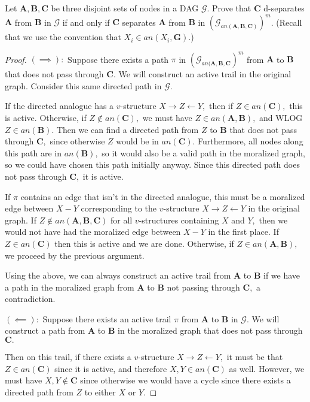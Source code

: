\documentclass[letterpaper]{article}
\begin{document}
Let $\mathbf{A,B,C}$ be three disjoint sets of nodes in a DAG $\mathcal{G}$. Prove that $\mathbf{C}$ d-separates $\mathbf{A}$ from $\mathbf{B}$ in $\mathcal{G}$ if and only if $\mathbf{C}$ separates $\mathbf{A}$ from $\mathbf{B}$ in $(\mathcal{G}_{an(\mathbf{A,B,C})})^m$. (Recall that we use the convention that $X_i \in an(X_i,\mathbf{G})$.)
\begin{proof}
  $(\implies):$ Suppose there exists a path $\pi$ in $\left( \mathcal{G}_{an(\mathbf{A, B, C}} \right)^m$ from $\mathbf{A}$ to $\mathbf{B}$ that does not pass through $\mathbf{C}.$ We will construct an active trail in the original graph. Consider this same directed path in $\mathcal{G}.$ 
    
    If the directed analogue has a $v$-structure $X\to Z\gets Y,$ then if $Z\in an(\mathbf{C}),$ this is active. Otherwise, if $Z\not\in an(\mathbf{C}),$ we must have $Z\in an(\mathbf{A, B}),$ and WLOG $Z\in an(\mathbf{B}).$ Then we can find a directed path from $Z$ to $\mathbf{B}$ that does not pass through $\mathbf{C},$ since otherwise $Z$ would be in $an(\mathbf{C}).$ Furthermore, all nodes along this path are in $an(\mathbf{B}),$ so it would also be a valid path in the moralized graph, so we could have chosen this path initially anyway. Since this directed path does not pass through $\mathbf{C},$ it is active.

    If $\pi$ contains an edge that isn't in the directed analogue, this must be a moralized edge between $X-Y$ corresponding to the $v$-structure $X\to Z\gets Y$ in the original graph. If $Z\not\in an(\mathbf{A, B, C})$ for all $v$-structures containing $X$ and $Y,$ then we would not have had the moralized edge between $X-Y$ in the first place. If $Z\in an(\mathbf{C})$ then this is active and we are done. Otherwise, if $Z\in an(\mathbf{A, B}),$ we proceed by the previous argument.  

    Using the above, we can always construct an active trail from $\mathbf{A}$ to $\mathbf{B}$ if we have a path in the moralized graph from $\mathbf{A}$ to $\mathbf{B}$ not passing through $\mathbf{C},$ a contradiction.

    $(\impliedby):$ Suppose there exists an active trail $\pi$ from $\mathbf{A}$ to $\mathbf{B}$ in $\mathcal{G}.$ We will construct a path from $\mathbf{A}$ to $\mathbf{B}$ in the moralized graph that does not pass through $\mathbf{C}.$ 
    
    Then on this trail, if there exists a $v$-structure $X\to Z\gets Y,$ it must be that $Z\in an(\mathbf{C})$ since it is active, and therefore $X, Y\in an(\mathbf{C})$ as well. However, we must have $X, Y\not\in\mathbf{C}$ since otherwise we would have a cycle since there exists a directed path from $Z$ to either $X$ or $Y.$ 


\end{proof}
\end{document}
